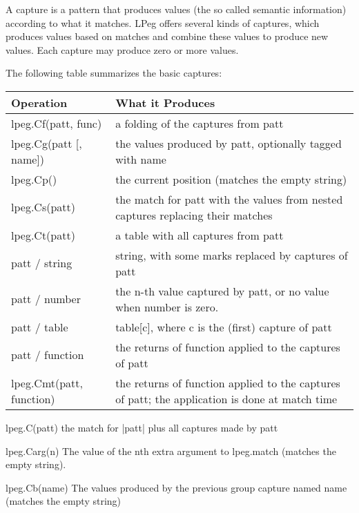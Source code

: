 A capture is a pattern that produces values (the so called semantic information) according to what it matches. LPeg offers several kinds of captures, which produces values based on matches and combine these values to produce new values. Each capture may produce zero or more values.

The following table summarizes the basic captures:
\label{tbl:peg}
\nobreak
\begin{longtable}[c]{|l|p{8cm}|}
\hline
Operation	   &What it Produces\\
\hline

lpeg.Cf(patt, func)	&a folding of the captures from patt\\
lpeg.Cg(patt [, name])	&the values produced by patt, optionally tagged with name\\
lpeg.Cp()	&the current position (matches the empty string)\\
lpeg.Cs(patt)	&the match for patt with the values from nested captures replacing their matches\\
lpeg.Ct(patt)	&a table with all captures from patt\\
patt / string	&string, with some marks replaced by captures of patt\\
patt / number	&the n-th value captured by patt, or no value when number is zero.\\
patt / table	&table[c], where c is the (first) capture of patt\\
patt / function	&the returns of function applied to the captures of patt\\
lpeg.Cmt(patt, function)	&the returns of function applied to the captures of patt; the application is done at match time\\
\hline
\end{longtable}





\begin{docLpeg}{lpeg.C(patt)}
the match for |patt| plus all captures made by patt
\end{docLpeg} 

\begin{docLpeg}{lpeg.Carg(n)}	
The value of the nth extra argument to lpeg.match (matches the empty string).
\end{docLpeg}

\begin{docLpeg}{lpeg.Cb(name)}
The values produced by the previous group capture named name (matches the empty string)
\end{docLpeg}

